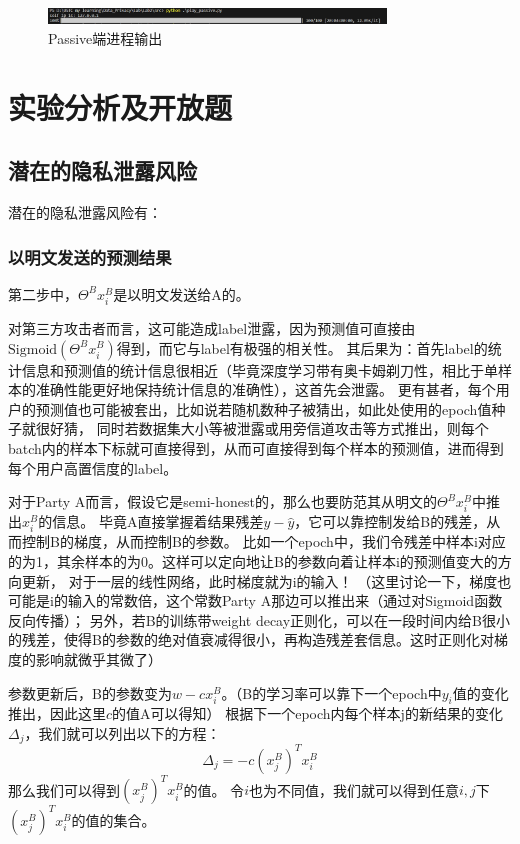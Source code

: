 \documentclass[twoside,11pt]{article}
\begin{document}
\begin{figure}[htbp]
    \centering
    \includegraphics[width=0.8\textwidth]{pic/passive-output.png}
    \caption{Passive端进程输出}
    \label{fig:passive}
\end{figure}

\newpage
\section{实验分析及开放题}

\subsection{潜在的隐私泄露风险}

潜在的隐私泄露风险有：

\subsubsection{以明文发送的预测结果}
第二步中，$\Theta^B x_i^B$是以明文发送给A的。

对第三方攻击者而言，这可能造成label泄露，因为预测值可直接由$\mathrm{Sigmoid}(\Theta^B x_i^B)$得到，而它与label有极强的相关性。
其后果为：首先label的统计信息和预测值的统计信息很相近（毕竟深度学习带有奥卡姆剃刀性，相比于单样本的准确性能更好地保持统计信息的准确性），这首先会泄露。
更有甚者，每个用户的预测值也可能被套出，比如说若随机数种子被猜出，如此处使用的epoch值种子就很好猜，
同时若数据集大小等被泄露或用旁信道攻击等方式推出，则每个batch内的样本下标就可直接得到，从而可直接得到每个样本的预测值，进而得到每个用户高置信度的label。

对于Party A而言，假设它是semi-honest的，那么也要防范其从明文的$\Theta^B x_i^B$中推出$x_i^B$的信息。
毕竟A直接掌握着结果残差$y-\hat{y}$，它可以靠控制发给B的残差，从而控制B的梯度，从而控制B的参数。
比如一个epoch中，我们令残差中样本i对应的为1，其余样本的为0。这样可以定向地让B的参数向着让样本i的预测值变大的方向更新，
对于一层的线性网络，此时梯度就为i的输入！
（这里讨论一下，梯度也可能是i的输入的常数倍，这个常数Party A那边可以推出来（通过对Sigmoid函数反向传播）；
另外，若B的训练带weight decay正则化，可以在一段时间内给B很小的残差，使得B的参数的绝对值衰减得很小，再构造残差套信息。这时正则化对梯度的影响就微乎其微了）

参数更新后，B的参数变为$w - c x_i^B$。（B的学习率可以靠下一个epoch中$y_i$值的变化推出，因此这里$c$的值A可以得知）
根据下一个epoch内每个样本j的新结果的变化$\Delta_j$，我们就可以列出以下的方程：
$$
    \Delta_j =  - c (x_j^B)^T x_i^B
$$
那么我们可以得到$(x_j^B)^T x_i^B$的值。
令$i$也为不同值，我们就可以得到任意$i,j$下$(x_j^B)^T x_i^B$的值的集合。
\end{document}
